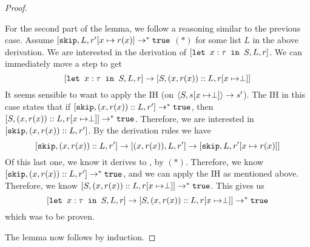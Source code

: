 \begin{proof}
\begin{itemize}[noitemsep]
    For the second part of the lemma, we follow a reasoning similar to the previous case. 
    Assume $[ \texttt{skip}, L, r'[x\mapsto r(x) ] \to ^{*} \texttt{true}$ $( * )$ for some list $L$ in the above derivation. We are interested in the derivation of $[ \texttt{let }x : \tau \texttt{ in } S, L, r ]$. We can immediately move a step to get
    $$[ \texttt{let }x : \tau \texttt{ in } S, L, r ] \to [ S, (x,r(x))::L, r[x\mapsto \perp] ]$$
    It seems sensible to want to apply the IH (on $\langle S, s[x\mapsto \perp] \rangle \to s'$). The IH in this case states that if $[ \texttt{skip}, (x,r(x))::L, r' ] \to^{*} \texttt{true}$, then $[ S, (x,r(x))::L, r[x\mapsto \perp] ] \to^{*} \texttt{true}$. Therefore, we are interested in $[ \texttt{skip}, (x,r(x))::L, r' ]$. By the derivation rules we have
    $$[ \texttt{skip}, (x,r(x))::L, r' ] \to [ (x,r(x)), L, r' ] \to [ \texttt{skip}, L, r'[x \mapsto r(x)] ]$$
    Of this last one, we know it derives to \tr, by $( * )$. Therefore, we know $[ \texttt{skip}, (x,r(x))::L, r' ] \to^{*} \texttt{true}$, and we can apply the IH as mentioned above. Therefore, we know $[ S, (x,r(x))::L, r[x\mapsto \perp] ] \to^{*} \texttt{true}$. This gives us
    $$[ \texttt{let }x : \tau \texttt{ in } S, L, r ] \to [ S, (x,r(x))::L, r[x\mapsto \perp] ] \to ^{*} \texttt{true}$$
    which was to be proven.
\end{itemize}
The lemma now follows by induction. 
\end{proof}

